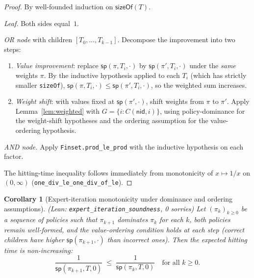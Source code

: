\documentclass[reqno,11pt]{amsart}
\newcommand{\sP}{\mathsf{sp}}
\newcommand{\nid}{\mathsf{nid}}
\newcommand{\leanverified}[1]{\textup{(Lean: \texttt{\small #1}, 0 sorries)}}
\theoremstyle{plain}
\newtheorem{corollary}[theorem]{Corollary}
\theoremstyle{definition}
\theoremstyle{remark}
\begin{document}
\begin{proof}
By well-founded induction on $\mathsf{sizeOf}(T)$.

\emph{Leaf.} Both sides equal~$1$.

\emph{OR node} with children $[T_0,\ldots,T_{k-1}]$. Decompose the improvement into two steps:
\begin{enumerate}[leftmargin=*]
\item \emph{Value improvement}: replace $\sP(\pi, T_i, \cdot)$ by $\sP(\pi', T_i, \cdot)$ under the \emph{same} weights $\pi$. By the inductive hypothesis applied to each $T_i$ (which has strictly smaller \texttt{sizeOf}), $\sP(\pi, T_i, \cdot) \le \sP(\pi', T_i, \cdot)$, so the weighted sum increases.
\item \emph{Weight shift}: with values fixed at $\sP(\pi', \cdot)$, shift weights from $\pi$ to $\pi'$. Apply Lemma~\ref{lem:weighted} with $G = \{i : C(\nid, i)\}$, using policy-dominance for the weight-shift hypotheses and the ordering assumption for the value-ordering hypothesis.
\end{enumerate}

\emph{AND node.} Apply \texttt{Finset.prod\_le\_prod} with the inductive hypothesis on each factor.

The hitting-time inequality follows immediately from monotonicity of $x \mapsto 1/x$ on $(0,\infty)$ (\texttt{one\_div\_le\_one\_div\_of\_le}).
\end{proof}

\begin{corollary}[Expert-iteration monotonicity under dominance and ordering assumptions]\label{cor:expert}
\leanverified{expert\_iteration\_soundness}
Let $(\pi_k)_{k \ge 0}$ be a sequence of policies such that $\pi_{k+1}$ dominates $\pi_k$ for each $k$, both policies remain well-formed, and the value-ordering condition holds at each step (correct children have higher $\sP(\pi_{k+1}, \cdot)$ than incorrect ones). Then the expected hitting time is non-increasing:
\[
\frac{1}{\sP(\pi_{k+1}, T, 0)} \;\le\; \frac{1}{\sP(\pi_k, T, 0)} \quad \text{for all } k \ge 0.
\]
\end{corollary}
\end{document}
